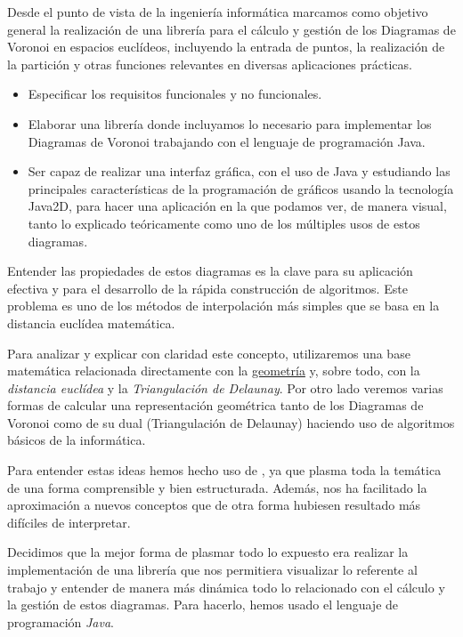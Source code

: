 Desde el punto de vista de la ingeniería informática marcamos como objetivo general la realización de una librería para el cálculo y gestión de los Diagramas de Voronoi en espacios euclídeos, incluyendo la entrada de puntos, la realización de la partición y otras funciones relevantes en diversas aplicaciones prácticas.
\begin{itemize}
	\item[{\ding{80}}] Especificar los requisitos funcionales y no funcionales.
	\item[{\ding{80}}] Elaborar una librería donde incluyamos lo necesario para implementar los Diagramas de Voronoi trabajando con el lenguaje de programación Java.
	\item[{\ding{80}}] Ser capaz de realizar una interfaz gráfica, con el uso de Java y estudiando las principales características de la programación de gráficos usando la tecnología Java2D, para hacer una aplicación en la que podamos ver, de manera visual, tanto lo explicado teóricamente como uno de los múltiples usos de estos diagramas.
\end{itemize}

Entender las propiedades de estos diagramas es la clave para su aplicación efectiva y para el desarrollo de la rápida construcción de algoritmos. Este problema es uno de los métodos de interpolación más simples que se basa en la distancia euclídea matemática. 
 
Para analizar y explicar con claridad este concepto, utilizaremos una base matemática relacionada directamente con la \underline{geometría} y, sobre todo, con la  \emph{distancia euclídea} y la \emph{Triangulación de Delaunay}. Por otro lado veremos varias formas de calcular una representación geométrica tanto de los Diagramas de Voronoi como de su dual (Triangulación de Delaunay) haciendo uso de algoritmos básicos de la informática.

 
Para entender estas ideas hemos hecho uso de \cite{clo}, ya que plasma toda la temática de una forma comprensible y bien estructurada. Además, nos ha facilitado la aproximación a nuevos conceptos que de otra forma hubiesen resultado más difíciles de interpretar.
 
Decidimos que la mejor forma de plasmar todo lo expuesto era realizar la implementación de una librería que nos permitiera visualizar lo referente al trabajo y entender de manera más dinámica todo lo relacionado con el cálculo y la gestión de estos diagramas. Para hacerlo, hemos usado el lenguaje de programación \emph{Java}.

